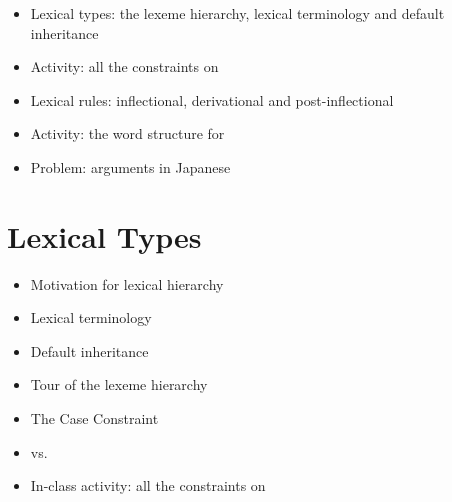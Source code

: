 \documentclass[a4paper,landscape,headrule,footrule]{foils}
\begin{document}
\maketitle


\begin{itemize}
\item Lexical types: the lexeme hierarchy, lexical terminology and
  default inheritance
\item Activity: all the constraints on 
\item Lexical rules: inflectional, derivational and post-inflectional
\item Activity: the word structure for 
\item Problem: arguments in Japanese
\end{itemize}

\section{Lexical Types}

\begin{itemize}
\item Motivation for lexical hierarchy
\item Lexical terminology
\item Default inheritance
\item Tour of the lexeme hierarchy
\item The Case Constraint
\item {} vs.\ 
\item In-class activity: all the constraints on 
\end{itemize}
\end{document}
